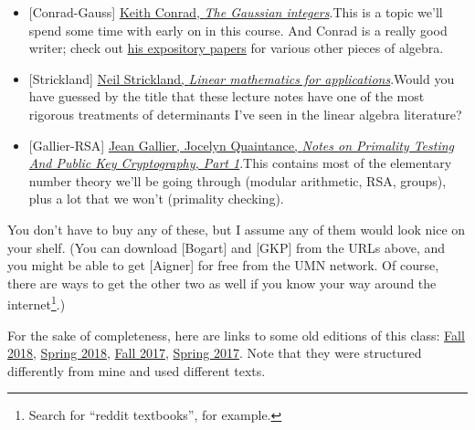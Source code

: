 \documentclass[numbers=enddot,12pt,final,onecolumn,notitlepage]{scrartcl}%
\theoremstyle{definition}
\newenvironment{fineprint}{\begin{small}}{\end{small}}
\newenvironment{noncompile}{}{}
\begin{document}
\begin{itemize}
\item {}[Conrad-Gauss]
\href{http://www.math.uconn.edu/~kconrad/blurbs/ugradnumthy/Zinotes.pdf}{Keith
Conrad, \textit{The Gaussian integers}}.\newline This is a topic we'll spend
some time with early on in this course. And Conrad is a really good writer;
check out \href{http://www.math.uconn.edu/~kconrad/blurbs/}{his expository
papers} for various other pieces of algebra.

\item {}[Strickland]
\href{https://neil-strickland.staff.shef.ac.uk/courses/MAS201/MAS201.pdf}{Neil
Strickland, \textit{Linear mathematics for applications}}.\newline Would you
have guessed by the title that these lecture notes have one of the most
rigorous treatments of determinants I've seen in the linear algebra literature?

\item {}[Gallier-RSA]
\href{https://www.cis.upenn.edu/~jean/RSA-primality-testing.pdf}{Jean Gallier,
Jocelyn Quaintance, \textit{Notes on Primality Testing And Public Key
Cryptography, Part 1}}.\newline This contains most of the elementary number
theory we'll be going through (modular arithmetic, RSA, groups), plus a lot
that we won't (primality checking).
\end{itemize}

\begin{noncompile}
You don't have to buy any of these, but I assume any of them would look nice
on your shelf. (You can download [Bogart] and [GKP] from the URLs above, and
you might be able to get [Aigner] for free from the UMN network. Of course,
there are ways to get the other two as well if you know your way around the
internet\footnote{Search for \textquotedblleft reddit
textbooks\textquotedblright, for example.}.)
\end{noncompile}

\begin{fineprint}
For the sake of completeness, here are links to some old editions of this
class: \href{http://www-users.math.umn.edu/~kim00657/teaching/18f4281/}{Fall
2018}, \href{http://mchmutov.net/teaching/4281teaching.html}{Spring 2018},
\href{http://www-users.math.umn.edu/~musiker/4281/}{Fall 2017},
\href{http://www-users.math.umn.edu/~musiker/4281/}{Spring 2017}. Note that
they were structured differently from mine and used different texts.
\end{fineprint}
\end{document}
